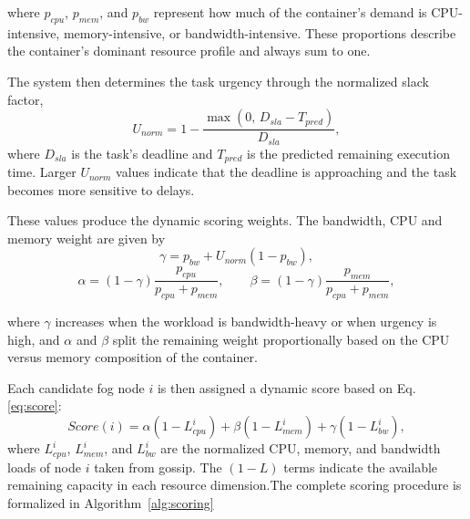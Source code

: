 \documentclass{article}
\begin{document}
where $p_{cpu}$, $p_{mem}$, and $p_{bw}$ represent how much of the container's demand is CPU-intensive, memory-intensive, or bandwidth-intensive. These proportions describe the container's dominant resource profile and always sum to one.

The system then determines the task urgency through the normalized slack factor,
\begin{equation}
U_{norm} = 1 - \frac{\max(0,\,D_{sla} - T_{pred})}{D_{sla}},
\label{eq:unorm}
\end{equation}
where $D_{sla}$ is the task's deadline and $T_{pred}$ is the predicted remaining execution time. Larger $U_{norm}$ values indicate that the deadline is approaching and the task becomes more sensitive to delays.

These values produce the dynamic scoring weights. The bandwidth, CPU and memory weight are given by
\begin{equation}
\gamma = p_{bw} + U_{norm}(1 - p_{bw}),
\label{eq:gamma_weight}
\end{equation}
\begin{equation}
\alpha = (1-\gamma)\frac{p_{cpu}}{p_{cpu}+p_{mem}}, 
\qquad
\beta  = (1-\gamma)\frac{p_{mem}}{p_{cpu}+p_{mem}},
\label{eq:alpha_beta_weights}
\end{equation}

where $\gamma$ increases when the workload is bandwidth-heavy or when urgency is high, and $\alpha$ and $\beta$ split the remaining weight proportionally based on the CPU versus memory composition of the container.

Each candidate fog node $i$ is then assigned a dynamic score based on Eq. \ref{eq:score}:
\begin{equation}
Score(i) = \alpha \left(1 - L^{i}_{cpu}\right)
+ \beta \left(1 - L^{i}_{mem}\right)
+ \gamma \left(1 - L^{i}_{bw}\right),
\label{eq:score}
\end{equation}
where $L^{i}_{cpu}$, $L^{i}_{mem}$, and $L^{i}_{bw}$ are the normalized CPU, memory, and bandwidth loads of node $i$ taken from gossip. The $(1 - L)$ terms indicate the available remaining capacity in each resource dimension.The complete scoring procedure is formalized in Algorithm~\ref{alg:scoring}
\end{document}
